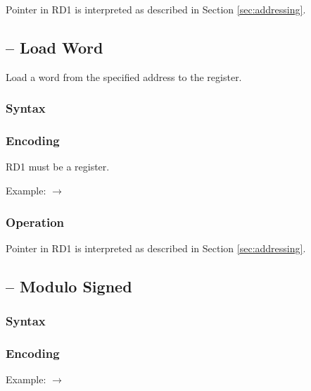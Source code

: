 \documentclass[a4paper,12pt,twoside,extrafontsizes]{memoir}
\begin{document}
{

Pointer in RD1 is interpreted as described in Section \ref{sec:addressing}.

\subsection{ -- Load Word}
\label{subsec:instr:lw}

Load a word from the specified address to the register.

\subsubsection{Syntax}


\subsubsection{Encoding}


RD1 must be a register.

Example:  $\rightarrow$ 

\subsubsection{Operation}


Pointer in RD1 is interpreted as described in Section \ref{sec:addressing}.

\subsection{ -- Modulo Signed}
\label{subsec:instr:mods}

\subsubsection{Syntax}


\subsubsection{Encoding}


Example:  $\rightarrow$ 

}
\end{document}
